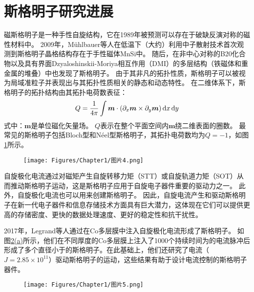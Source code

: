 \section{斯格明子研究进展}
磁斯格明子是一种手性自旋结构，它在1989年被预测可以存在于破缺反演对称的磁性材料中。
2009年，M\"uhlbauer等人在低温下（大约）利用中子散射技术首次观测到斯格明子晶格结构存在于手性磁体MnSi中。
随后，在非中心对称的B20化合物以及具有界面Dzyaloshinskii-Moriya相互作用（DMI）的多层结构（铁磁体和重金属的堆叠）中也发现了斯格明子。
由于其非凡的拓扑性质，斯格明子可以被视为局域准粒子并表现出与其拓扑性质相关的静态和动态特性。
在二维体系下，斯格明子的拓扑结构由其拓扑电荷数表征：
\begin{equation}
    Q = \frac{1}{4\pi}\int \bm{m} \cdot \left( \partial_x \bm{m} \times \partial_y \bm{m} \right) \mathop{}\!\mathrm{d} x \mathop{}\!\mathrm{d} y
    \label{公式1-4}
\end{equation}
式中：$\bm{m}$是单位磁化矢量场。
$Q$表示在整个平面空间内$\bm{m}$绕二维表面的圈数。
最常见的斯格明子包括Bloch型和N\'eel型斯格明子，其拓扑电荷数均为$Q=-1$，如图\ref{图1.4}所示。
\begin{figure}[htb]
    \centering
    \texttt{[image: Figures/Chapter1/图片4.png]}
    \label{图1.4}
\end{figure}\par
自旋极化电流通过对磁矩产生自旋转移力矩（STT）或自旋轨道力矩（SOT）从而推动斯格明子运动，这是斯格明子应用于自旋电子器件重要的驱动力之一。
此外，自旋极化电流也可以用来创建斯格明子。
因此，自旋电流产生和驱动斯格明子在新一代电子器件和信息存储技术方面具有巨大潜力，这体现在它们可以提供更高的存储密度、更快的数据处理速度、更好的稳定性和抗干扰性。\par
2017年，Legrand等人通过在Co多层膜中注入自旋极化电流形成了斯格明子。
如图\ref{图1.5}\hyperlink{子图1.5}{(a)}所示，他们在不同厚度的Co多层膜上注入了1000个持续时间为的电流脉冲后形成了多个直径小于的斯格明子。在此基础上，他们还研究了电流（$J = 2.85\times 10^{11}$）驱动斯格明子的运动，这些结果有助于设计电流控制的斯格明子器件。
\begin{figure}[htb]
    \hypertarget{子图1.5}{}
    \centering
    \texttt{[image: Figures/Chapter1/图片5.png]}
    \label{图1.5}
\end{figure}
